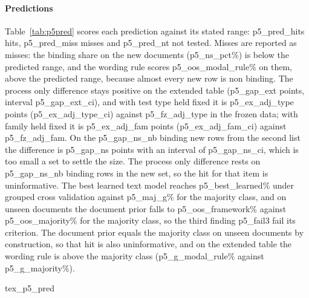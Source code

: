 \documentclass[conference]{IEEEtran}
\begin{document}
\paragraph{Predictions} Table~\ref{tab:p5pred} scores each prediction against its stated range: {{p5_pred_hits}} hits, {{p5_pred_miss}} misses and {{p5_pred_nt}} not tested. Misses are reported as misses: the binding share on the new documents ({{p5_ns_pct}}\%) is below the predicted range, and the wording rule scores {{p5_oos_modal_rule}}\% on them, above the predicted range, because almost every new row is non binding. The process only difference stays positive on the extended table ({{p5_gap_ext}} points, interval {{p5_gap_ext_ci}}), and with test type held fixed it is {{p5_ex_adj_type}} points ({{p5_ex_adj_type_ci}}) against {{p5_fz_adj_type}} in the frozen data; with family held fixed it is {{p5_ex_adj_fam}} points ({{p5_ex_adj_fam_ci}}) against {{p5_fz_adj_fam}}. On the {{p5_gap_ns_nb}} binding new rows from the second list the difference is {{p5_gap_ns}} points with an interval of {{p5_gap_ns_ci}}, which is too small a set to settle the size. The process only difference rests on {{p5_gap_ns_nb}} binding rows in the new set, so the hit for that item is uninformative. The best learned text model reaches {{p5_best_learned}}\% under grouped cross validation against {{p5_maj_g}}\% for the majority class, and on unseen documents the document prior falls to {{p5_oos_framework}}\% against {{p5_oos_majority}}\% for the majority class, so the third finding {{p5_fail3}} fail its criterion. The document prior equals the majority class on unseen documents by construction, so that hit is also uninformative, and on the extended table the wording rule is above the majority class ({{p5_g_modal_rule}}\% against {{p5_g_majority}}\%).

\begin{table}[t]\centering\small
{{tex_p5_pred}}
\caption{Preregistered predictions and their outcome.}\label{tab:p5pred}
\end{table}
\end{document}
